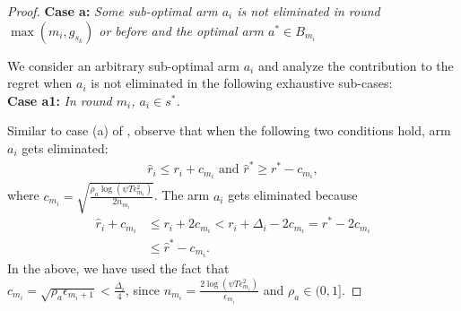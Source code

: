 \begin{proof}
\textbf{Case a:} \textit{Some sub-optimal arm $a_{i}$ is not eliminated in round $\max(m_{i},g_{s_{k}})$ or before and the optimal arm $a^{*}\in B_{m_{i}}$}

We consider an arbitrary sub-optimal arm $a_{i}$ and analyze the contribution to the regret when $a_i$ is not eliminated in the following exhaustive sub-cases:\\
\textbf{Case a1:} \textit{In round $m_i$, $a_{i} \in s^{*}$.} 

Similar to case (a) of \cite{auer2010ucb}, observe that when the following two conditions hold, arm $a_i$ gets eliminated:
\begin{align}
\hat{r}_{i}  \le r_{i} + c_{m_{i}} \text{ and } 
 \hat{r}^{*}\geq  r^{*} - c_{m_{i}}, \label{eq:armelim-casea}
\end{align}
where  $c_{m_{i}}=\sqrt{\frac{\rho_{a}\log (\psi T\epsilon_{m_{i}}^{2})}{2 n_{m_{i}}}}$.
The arm $a_i$ gets eliminated because 
  \begin{align*}
\hat{r}_{i} + c_{m_{i}}&\leq r_{i} + 2c_{m_{i}} < r_{i} + \Delta_{i} - 2c_{m_{i}} = r^{*} -2c_{m_{i}} \\
 &\leq \hat{r}^{*} - c_{m_{i}}.
  \end{align*}
In the above, we have used the fact that \\ $c_{m_{i}} = \sqrt{\rho_{a}\epsilon_{m_{i}+1}} < \frac{\Delta_{i}}{4}$, since $n_{m_{i}}=\frac{2\log{(\psi T\epsilon_{m_{i}}^{2})}}{\epsilon_{m_{i}}}$ and $\rho_{a}\in (0,1]$.


\end{proof}
